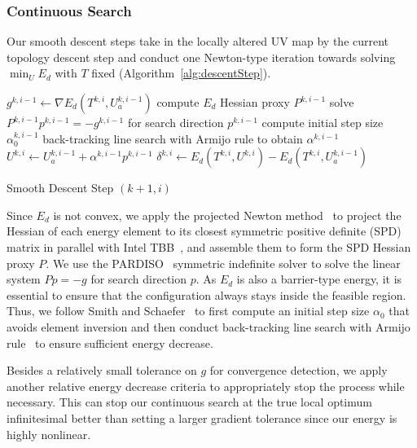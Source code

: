 \subsubsection{Continuous Search}
\label{sec:descentStep}

Our smooth descent steps take in the locally altered UV map by the current topology descent step and conduct one Newton-type iteration towards solving $\min_U E_d$ with $T$ fixed (Algorithm~\ref{alg:descentStep}).

\begin{algorithm}[h]
\SetAlgoLined
{}
$g^{k,i-1} \leftarrow \nabla E_{d}(T^{k,i}, U_a^{k,i-1})$\;
compute $E_{d}$ Hessian proxy $P^{k,i-1}$\;
solve $P^{k,i-1} p^{k,i-1} = -g^{k,i-1}$ for search direction $p^{k,i-1}$\;
compute initial step size $\alpha^{k,i-1}_0$\;
back-tracking line search with Armijo rule to obtain $\alpha^{k,i-1}$\;
$U^{k,i} \leftarrow U_a^{k,i-1} + \alpha^{k,i-1} p^{k,i-1}$\;
$\delta^{k,i} \leftarrow E_{d}(T^{k,i}, U^{k,i}) - E_{d}(T^{k,i}, U_a^{k,i-1})$\;
\caption{Smooth Descent Step $(k+1,i)$}
\label{alg:descentStep}
\end{algorithm}
Since $E_{d}$ is not convex, we apply the projected Newton method\ \cite{Teran2005Robust} to project the Hessian of each energy element to its closest symmetric positive definite (SPD) matrix in parallel with Intel TBB~\cite{Reinders2007Intel}, and assemble them to form the SPD Hessian proxy $P$. We use the PARDISO~\cite{pardiso-6.0a, pardiso-6.0b} symmetric indefinite solver to solve the linear system $P p = -g$ for search direction $p$.  As $E_{d}$ is also a barrier-type energy, it is essential to ensure that the configuration always stays inside the feasible region. Thus, we follow Smith and Schaefer~ to first compute an initial step size $\alpha_0$ that avoids element inversion and then conduct back-tracking line search with Armijo rule~\cite{Armijo1966Minimization} to ensure sufficient energy decrease.

Besides a relatively small tolerance on $g$ for convergence detection, we apply another relative energy decrease criteria to appropriately stop the process while necessary.
This can stop our continuous search at the true local optimum infinitesimal better than setting a larger gradient tolerance since our energy is highly nonlinear.

